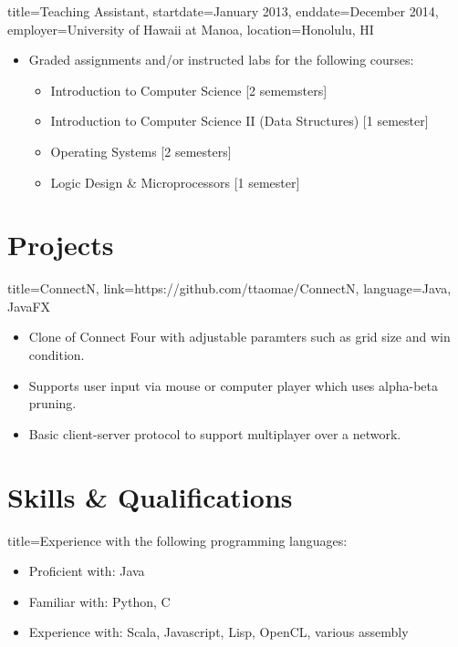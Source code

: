 \documentclass{resume}
\begin{document}
\begin{job}{title=Teaching Assistant,
            startdate=January 2013,
            enddate=December 2014,
            employer=University of Hawaii at Manoa,
            location={Honolulu, HI}}
    \begin{itemize}
        \item{Graded assignments and/or instructed labs for the following courses:}
        \begin{itemize}
            \item{Introduction to Computer Science [2 sememsters]}
            \item{Introduction to Computer Science II (Data Structures) [1 semester]}
            \item{Operating Systems [2 semesters]}
            \item{Logic Design \& Microprocessors [1 semester]}
        \end{itemize}
    \end{itemize}
\end{job}

\section*{Projects}
\begin{project}{title=ConnectN,
            link=https://github.com/ttaomae/ConnectN,
            language={Java, JavaFX}}
    \begin{itemize}
        \item{Clone of Connect Four with adjustable paramters such as grid size and win condition.}
        \item{Supports user input via mouse or computer player which uses alpha-beta pruning.}
        \item{Basic client-server protocol to support multiplayer over a network.}
    \end{itemize}
\end{project}

\section*{Skills \& Qualifications}
\begin{skill}{title=Experience with the following programming languages:}
    \begin{itemize}
        \item{Proficient with: Java}
        \item{Familiar with: Python, C}
        \item{Experience with: Scala, Javascript, Lisp, OpenCL, various assembly}
    \end{itemize}
\end{skill}
\end{document}
